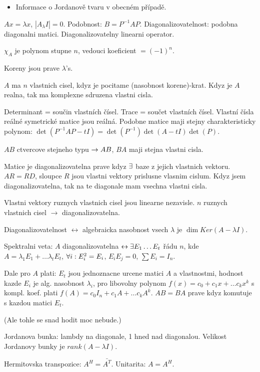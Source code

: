 \begin{itemize}
\item Informace o Jordanově tvaru v obecném případě.
\end{itemize}

\begin{understood}
$Ax=\lambda x$, $|A_\lambda I|=0$.
Podobnost: $B=P^{-1} AP$.
Diagonalizovatelnost: podobna diagonalni matici.
Diagonalizovatelny linearni operator.
\end{understood}

$\chi_A$ je polynom stupne $n$, vedouci koeficient $=(-1)^n$.
\begin{understood}
Koreny jsou prave $\lambda$'s.
\end{understood}
$A$ ma $n$ vlastnich cisel, kdyz je pocitame (nasobnost korene)-krat.
Kdyz je $A$ realna, tak ma komplexne sdruzena vlastni cisla.

Determinant = součin vlastních čísel.
Trace = součet vlastních čísel.
Vlastní čísla reálné symetrické matice jsou reálná.
Podobne matice maji stejny charakteristicky polynom:
$\det(P^{-1}AP-tI)=\det(P^{-1})\det(A-tI)\det(P)$.

$AB$ ctvercove stejneho typu $\rightarrow AB$, $BA$ maji stejna vlastni cisla.

Matice je diagonalizovatelna prave kdyz $\exists$ baze z jejich vlastnich vektoru.
$AR=RD$, sloupce $R$ jsou vlastni vektory prislusne vlasnim cislum.
Kdyz jsem diagonalizovatelna, tak na te diagonale mam vsechna vlastni cisla.

Vlastni vektory ruznych vlastnich cisel jsou linearne nezavisle.
$n$ ruznych vlastnich cisel $\rightarrow$ diagonalizovatelna.

Diagonalizovatelnost $\leftrightarrow$
algebraicka nasobnost vsech $\lambda$ je $\dim Ker(A-\lambda I)$.

Spektralni veta: $A$ diagonalizovatelna $\leftrightarrow \exists E_1\ldots E_t$
řádu $n$, kde $A=\lambda_1 E_1+\ldots \lambda_t E_t$,
$\forall i: E_i^2=E_i$, $E_i E_j=0$, $\sum E_i=I_n$.

Dale pro $A$ plati: $E_t$ jsou jednoznacne urcene matici $A$ a vlastnostmi,
hodnost kazde $E_i$ je alg. nasobnost $\lambda_i$,
pro libovolny polynom $f(x)=c_0+c_1 x+\ldots c_k x^k$ s kompl. koef. plati
$f(A)=c_0 I_n + c_1 A+\ldots c_k A^k$.
$AB=BA$ prave kdyz komutuje s kazdou matici $E_t$.

(Ale tohle se snad hodit moc nebude.)

Jordanova bunka: lambdy na diagonale, 1 hned nad diagonalou.
Velikost Jordanovy bunky je $rank(A-\lambda I)$.

Hermitovska transpozice: $A^H=\bar{A^T}$. Unitarita: $A=A^H$.
